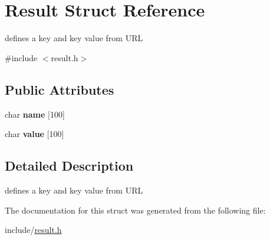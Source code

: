 \hypertarget{struct_result}{}\section{Result Struct Reference}
\label{struct_result}


defines a key and key value from U\+RL  




{\ttfamily \#include $<$result.\+h$>$}

\subsection*{Public Attributes}
\begin{DoxyCompactItemize}
\item 
\mbox{\label{struct_result_ae873948f19ecec15062ffabe2c844eab}} 
char {\bfseries name} \mbox{[}100\mbox{]}
\item 
\mbox{\label{struct_result_ae45a7cbff7ce965aae93d610057d6ed2}} 
char {\bfseries value} \mbox{[}100\mbox{]}
\end{DoxyCompactItemize}


\subsection{Detailed Description}
defines a key and key value from U\+RL 

The documentation for this struct was generated from the following file\+:\begin{DoxyCompactItemize}
\item 
include/\hyperlink{result_8h}{result.\+h}\end{DoxyCompactItemize}
